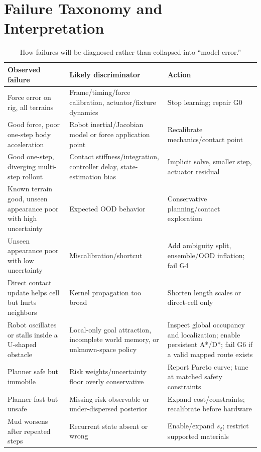 \section{Failure Taxonomy and Interpretation}
\label{app:failures}

\begin{table}[ht]
\centering
\caption{How failures will be diagnosed rather than collapsed into ``model error.''}
\label{tab:failure_taxonomy}
\small
\begin{tabularx}{\textwidth}{@{}L{31mm}Y Y@{}}
\toprule
\textbf{Observed failure} & \textbf{Likely discriminator} & \textbf{Action}\\
\midrule
Force error on rig, all terrains & Frame/timing/force calibration, actuator/fixture dynamics & Stop learning; repair G0\\
Good force, poor one-step body acceleration & Robot inertial/Jacobian model or force application point & Recalibrate mechanics/contact point\\
Good one-step, diverging multi-step rollout & Contact stiffness/integration, controller delay, state-estimation bias & Implicit solve, smaller step, actuator residual\\
Known terrain good, unseen appearance poor with high uncertainty & Expected OOD behavior & Conservative planning/contact exploration\\
Unseen appearance poor with low uncertainty & Miscalibration/shortcut & Add ambiguity split, ensemble/OOD inflation; fail G4\\
Direct contact update helps cell but hurts neighbors & Kernel propagation too broad & Shorten length scales or direct-cell only\\
Robot oscillates or stalls inside a U-shaped obstacle & Local-only goal attraction, incomplete world memory, or unknown-space policy & Inspect global occupancy and localization; enable persistent A*/D*; fail G6 if a valid mapped route exists\\
Planner safe but immobile & Risk weights/uncertainty floor overly conservative & Report Pareto curve; tune at matched safety constraints\\
Planner fast but unsafe & Missing risk observable or under-dispersed posterior & Expand cost/constraints; recalibrate before hardware\\
Mud worsens after repeated steps & Recurrent state absent or wrong & Enable/expand $s_\xi$; restrict supported materials\\
\bottomrule
\end{tabularx}
\end{table}

